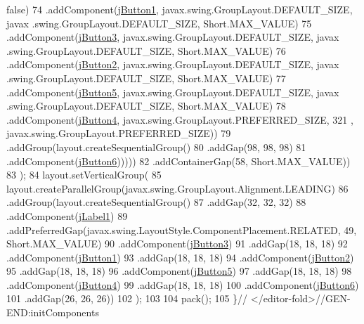 \begin{DoxyCode}
       \textcolor{keyword}{false})
74                                 .addComponent(\mbox{\hyperlink{classsoftware_1_1opcionespreso_aa05af6874bd2369082e5aacf3b2bb50d}{jButton1}}, javax.swing.GroupLayout.DEFAULT\_SIZE, javax
      .swing.GroupLayout.DEFAULT\_SIZE, Short.MAX\_VALUE)
75                                 .addComponent(\mbox{\hyperlink{classsoftware_1_1opcionespreso_adf21589322eda1079c8f08265ec86a83}{jButton3}}, javax.swing.GroupLayout.DEFAULT\_SIZE, javax
      .swing.GroupLayout.DEFAULT\_SIZE, Short.MAX\_VALUE)
76                                 .addComponent(\mbox{\hyperlink{classsoftware_1_1opcionespreso_a965bd56cdf43ac702899aff6b882fe53}{jButton2}}, javax.swing.GroupLayout.DEFAULT\_SIZE, javax
      .swing.GroupLayout.DEFAULT\_SIZE, Short.MAX\_VALUE)
77                                 .addComponent(\mbox{\hyperlink{classsoftware_1_1opcionespreso_a5948e430eec5399935a10ca8300296df}{jButton5}}, javax.swing.GroupLayout.DEFAULT\_SIZE, javax
      .swing.GroupLayout.DEFAULT\_SIZE, Short.MAX\_VALUE)
78                                 .addComponent(\mbox{\hyperlink{classsoftware_1_1opcionespreso_a7fe878181ce5171fa1a59956d589d900}{jButton4}}, javax.swing.GroupLayout.PREFERRED\_SIZE, 321
      , javax.swing.GroupLayout.PREFERRED\_SIZE))
79                             .addGroup(layout.createSequentialGroup()
80                                 .addGap(98, 98, 98)
81                                 .addComponent(\mbox{\hyperlink{classsoftware_1_1opcionespreso_af727e23b9f6fb213484737b6fb3a63d9}{jButton6}})))))
82                 .addContainerGap(58, Short.MAX\_VALUE))
83         );
84         layout.setVerticalGroup(
85             layout.createParallelGroup(javax.swing.GroupLayout.Alignment.LEADING)
86             .addGroup(layout.createSequentialGroup()
87                 .addGap(32, 32, 32)
88                 .addComponent(\mbox{\hyperlink{classsoftware_1_1opcionespreso_a61c0885ed9ce31eca799d9b0507589b7}{jLabel1}})
89                 .addPreferredGap(javax.swing.LayoutStyle.ComponentPlacement.RELATED, 49, Short.MAX\_VALUE)
90                 .addComponent(\mbox{\hyperlink{classsoftware_1_1opcionespreso_adf21589322eda1079c8f08265ec86a83}{jButton3}})
91                 .addGap(18, 18, 18)
92                 .addComponent(\mbox{\hyperlink{classsoftware_1_1opcionespreso_aa05af6874bd2369082e5aacf3b2bb50d}{jButton1}})
93                 .addGap(18, 18, 18)
94                 .addComponent(\mbox{\hyperlink{classsoftware_1_1opcionespreso_a965bd56cdf43ac702899aff6b882fe53}{jButton2}})
95                 .addGap(18, 18, 18)
96                 .addComponent(\mbox{\hyperlink{classsoftware_1_1opcionespreso_a5948e430eec5399935a10ca8300296df}{jButton5}})
97                 .addGap(18, 18, 18)
98                 .addComponent(\mbox{\hyperlink{classsoftware_1_1opcionespreso_a7fe878181ce5171fa1a59956d589d900}{jButton4}})
99                 .addGap(18, 18, 18)
100                 .addComponent(\mbox{\hyperlink{classsoftware_1_1opcionespreso_af727e23b9f6fb213484737b6fb3a63d9}{jButton6}})
101                 .addGap(26, 26, 26))
102         );
103 
104         pack();
105     \}\textcolor{comment}{// </editor-fold>//GEN-END:initComponents}
\end{DoxyCode}

